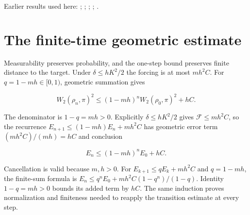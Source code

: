 \documentclass[11pt,a4paper]{article}
\begin{document}
Earlier results used here: \cite[Section~3.17.3]{LangevinLean2026ULASC}; \cite[Section~3.17.4]{LangevinLean2026ULASC}; \cite[Section~3.18.2]{LangevinLean2026ULASC}; \cite[Section~3.26.3]{LangevinLean2026ULASC}; \cite[Section~3.33.5]{LangevinLean2026ULASC}.

\section{\texorpdfstring{The finite-time geometric estimate}{The finite-time geometric estimate}}


Measurability preserves probability, and the one-step bound preserves finite distance to the target. Under \(\delta\le hK^2/2\) the forcing is at most \(mh^2C\). For \(q=1-mh\in[0,1)\), geometric summation gives

\[W_2(\rho_n,\pi)^2\le(1-mh)^nW_2(\rho_0,\pi)^2+hC.\]

The denominator is \(1-q=mh>0\). Explicitly \(\delta\le hK^2/2\) gives \(\mathcal F\le mh^2C\), so the recurrence \(E_{n+1}\le(1-mh)E_n+mh^2C\) has geometric error term \((mh^2C)/(mh)=hC\) and conclusion

\[E_n\le(1-mh)^nE_0+hC.\]

Cancellation is valid because \(m,h>0\). For \(E_{k+1}\le qE_k+mh^2C\) and \(q=1-mh\), the finite-sum formula is \(E_n\le q^nE_0+mh^2C(1-q^n)/(1-q)\). Identity \(1-q=mh>0\) bounds its added term by \(hC\). The same induction proves normalization and finiteness needed to reapply the transition estimate at every step.
\end{document}
